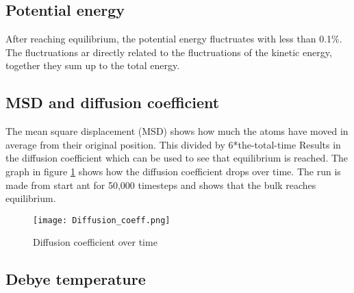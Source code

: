 \subsection{Potential energy}
After reaching equilibrium, the potential energy fluctruates with less than 0.1\%. The fluctruations ar directly related to the fluctruations of the kinetic energy, together they sum up to the total energy.

\subsection{MSD and diffusion coefficient}
The mean square displacement (MSD) shows how much the atoms have moved in average from their original position. This divided by 6*the-total-time Results in the diffusion coefficient which can be used to see that equilibrium is reached. The graph in figure \ref{fig:Diffusion_coeff} shows how the diffusion coefficient drops over time. The run is made from start ant for 50,000 timesteps and shows that the bulk reaches equilibrium. 
\begin{figure}[ht]
	\centering
	\texttt{[image: Diffusion\_coeff.png]}
	\caption{Diffusion coefficient over time}
	\label{fig:Diffusion_coeff}
\end{figure}


\subsection{Debye temperature}


